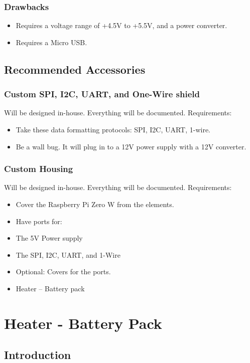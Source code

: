 \subsubsection{Drawbacks}
\begin{itemize}
	\item Requires a voltage range of +4.5V to +5.5V, and a power converter.
	\item Requires a Micro USB.
\end{itemize}
 
\subsection{Recommended Accessories}

\subsubsection{Custom SPI, I2C, UART, and One-Wire shield}

Will be designed in-house. Everything will be documented. Requirements:
\begin{itemize}
	\item Take these data formatting protocols: SPI, I2C, UART, 1-wire.
	\item Be a wall bug. It will plug in to a 12V power supply with a 12V converter.
\end{itemize}
\subsubsection{Custom Housing}

Will be designed in-house. Everything will be documented. Requirements:

\begin{itemize}
	\item Cover the Raspberry Pi Zero W from the elements.
	\item Have ports for:
	\item The 5V Power supply
	\item The SPI, I2C, UART, and 1-Wire
	\item Optional: Covers for the ports. 
	\item Heater – Battery pack
\end{itemize}

\section{Heater - Battery Pack}
\subsection{Introduction}

